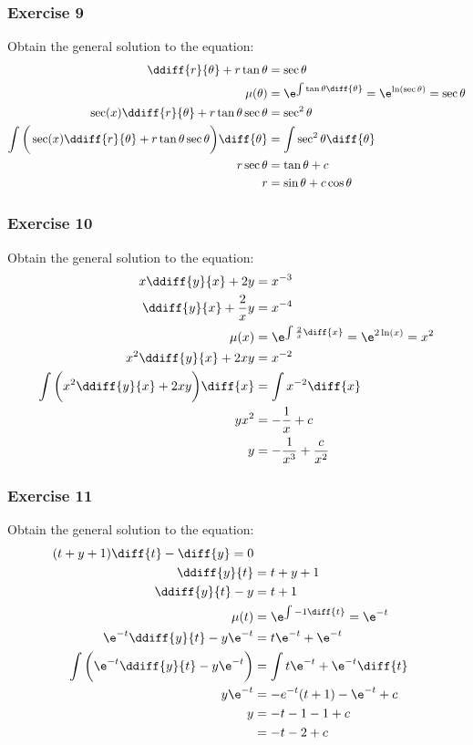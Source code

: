 \documentclass{math}
\begin{document}
\subsubsection*{Exercise 9}
Obtain the general solution to the equation:
\begin{align*}
  \ddiff{r}{\theta}+r\tan\theta &= \sec\theta \\
  \mu(\theta) &= \e^{\int\tan\theta\diff{\theta}} = \e^{\ln(\sec\theta)} =
    \sec\theta \\
  \sec(x)\ddiff{r}{\theta}+r\tan\theta\sec\theta &= \sec^2\theta \\
  \int\bigg(\sec(x)\ddiff{r}{\theta}+r\tan\theta\sec\theta\bigg)\diff{\theta} &=
    \int\sec^2\theta\diff{\theta} \\
  r\sec\theta &= \tan\theta+c \\
  r &= \sin\theta+c\cos\theta \\
\end{align*}

\subsubsection*{Exercise 10}
Obtain the general solution to the equation:
\begin{align*}
  x\ddiff{y}{x}+2y &= x^{-3} \\
  \ddiff{y}{x}+\frac{2}{x}y &= x^{-4} \\
  \mu(x) &= \e^{\int\frac{2}{x}\diff{x}} = \e^{2\ln(x)} = x^2 \\
  x^2\ddiff{y}{x}+2xy &= x^{-2} \\
  \int\bigg(x^2\ddiff{y}{x}+2xy\bigg)\diff{x} &= \int x^{-2}\diff{x} \\
  yx^2 &= -\frac{1}{x}+c \\
  y &= -\frac{1}{x^3}+\frac{c}{x^2}
\end{align*}

\subsubsection*{Exercise 11}
Obtain the general solution to the equation:
\begin{align*}
  (t+y+1)\diff{t}-\diff{y} = 0 \\
  \ddiff{y}{t} &= t+y+1 \\
  \ddiff{y}{t}-y &= t+1 \\
  \mu(t) &= \e^{\int-1\diff{t}} = \e^{-t} \\
  \e^{-t}\ddiff{y}{t}-y\e^{-t} &= t\e^{-t}+\e^{-t} \\
  \int\bigg(\e^{-t}\ddiff{y}{t}-y\e^{-t}\bigg) &=
    \int t\e^{-t}+\e^{-t}\diff{t} \\
  y\e^{-t} &= -e^{-t}(t+1)-\e^{-t}+c \\
  y &= -t-1-1+c \\
  &= -t-2+c
\end{align*}
\end{document}
